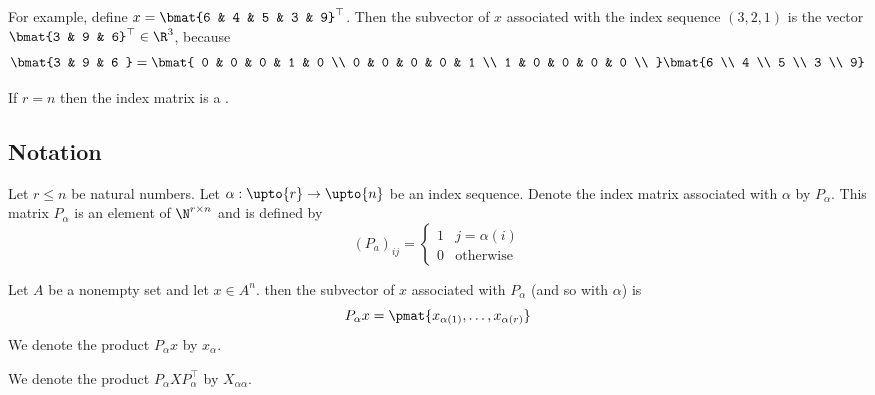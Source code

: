 For example, define $x = \bmat{6 & 4 & 5 & 3 & 9}^\top $.
Then the subvector of $x$ associated with the index sequence $(3, 2, 1)$ is the vector $\bmat{3 & 9 & 6}^\top  \in \R ^3$, because
\[
\bmat{3 & 9 & 6 } =
\bmat{
0 & 0 & 0 & 1 & 0 \\
0 & 0 & 0 & 0 & 1 \\
1 & 0 & 0 & 0 & 0 \\
}\bmat{6 \\ 4 \\ 5 \\ 3 \\ 9}
\]

If $r = n$ then the index matrix is a .

\subsection*{Notation}

Let $r \leq n$ be natural numbers.
Let $\alpha : \upto{r} \to \upto{n}$ be an index sequence.
Denote the index matrix associated with $\alpha $ by $P_\alpha $.
This matrix $P_\alpha $ is an element of $\N  ^{r \times  n}$ and is defined by
\[
(P_a)_{ij} = \begin{cases}
1 & j = \alpha (i) \\
0 & \text{otherwise}
\end{cases}
\]

Let $A$ be a nonempty set and let $x \in A^n$.
then the subvector of $x$ associated with $P_\alpha $ (and so with $\alpha $) is
\[
P_\alpha  x = \pmat{x_{\alpha (1)}, \dots , x_{\alpha (r)}}
\]
We denote the product $P_\alpha x$ by $x_{\alpha }$.

We denote the product $P_\alpha  X P_\alpha ^\top $ by $X_{\alpha \alpha }$.

